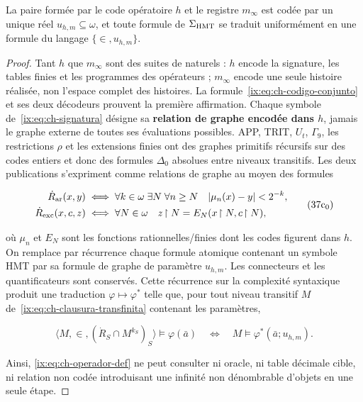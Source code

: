 \begin{lemma}
\label{ix:thm:ch-6}
La paire formée par
le code opératoire \(h\) et le registre \(m_\infty\) est codée par un unique
réel \(u_{h,m}\subseteq\omega\), et toute formule de \(\Sigma_{\rm HMT}\) se
traduit uniformément en une formule du langage \(\{\in,u_{h,m}\}\).

\end{lemma}
\begin{proof}
Tant \(h\) que \(m_\infty\) sont des suites de naturels : \(h\)
encode la signature, les tables finies et les programmes des opérateurs ;
\(m_\infty\) encode une seule histoire réalisée, non l’espace complet des
histoires. La formule~\eqref{ix:eq:ch-codigo-conjunto} et ses deux décodeurs prouvent la première
affirmation. Chaque symbole de~\eqref{ix:eq:ch-signatura} désigne sa \textbf{relation de graphe encodée dans \(h\)}, jamais le graphe externe de toutes ses évaluations possibles. APP,
TRIT, \(U_t\), \(\Gamma_9\), les restrictions \(\rho\) et les extensions
finies ont des graphes primitifs récursifs sur des codes entiers et donc des
formules \(\Delta_0\) absolues entre niveaux transitifs. Les deux
publications s’expriment comme relations de graphe au moyen des formules

\[
 \begin{aligned}
 \dot R_{\rm ar}(x,y)
 &\;\Longleftrightarrow\;
 \forall k\in\omega\;\exists N\;\forall n\ge N\quad
 |\mu_n(x)-y|<2^{-k},\\
 \dot R_{\rm exc}(x,c,z)
 &\;\Longleftrightarrow\;
 \forall N\in\omega\quad z\!\upharpoonright N
   =E_N(x\!\upharpoonright N,c\!\upharpoonright N),
 \end{aligned}
\tag{37c$_0$}\label{ix:eq:ch-grafos-publicacion}
\]

où \(\mu_n\) et \(E_N\) sont les fonctions rationnelles/finies dont les codes
figurent dans \(h\). On remplace par récurrence chaque formule atomique contenant
un symbole HMT par sa formule de graphe de paramètre \(u_{h,m}\). Les
connecteurs et les quantificateurs sont conservés. Cette récurrence sur la complexité
syntaxique produit une traduction \(\varphi\mapsto\varphi^*\) telle que, pour
tout niveau transitif \(M\) de~\eqref{ix:eq:ch-clausura-transfinita} contenant les paramètres,

\[
 \langle M,\in,(\dot R_S\cap M^{k_S})_S\rangle
   \models\varphi(\bar a)
 \quad\Longleftrightarrow\quad
 M\models\varphi^*(\bar a;u_{h,m}).
\tag{37c}\label{ix:eq:ch-eliminacion-uniforme}
\]

Ainsi, \eqref{ix:eq:ch-operador-def} ne peut consulter ni oracle, ni table décimale cible, ni relation non codée introduisant une infinité non dénombrable d'objets en une seule étape.
\end{proof}

